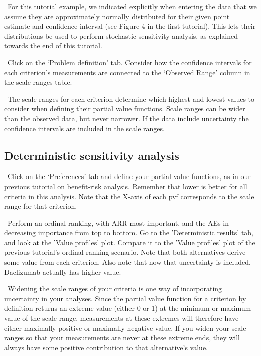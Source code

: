 \documentclass[00_mcda_tutorial.tex]{subfiles}
\begin{document}
\noindent \faGraduationCap \, For this tutorial example, we indicated explicitly when entering the data that we assume they are approximately normally distributed for their given point estimate and confidence interval (see Figure 4 in the first tutorial). This lets their distributions be used to perform stochastic sensitivity analysis, as explained towards the end of this tutorial.
\newline

\noindent \leftpointright \, Click on the ‘Problem definition’ tab. Consider how the confidence intervals for each criterion’s measurements are connected to the ‘Observed Range’ column in the scale ranges table.
\newline

\noindent \faGraduationCap \, The scale ranges for each criterion determine which highest and lowest values to consider when defining their partial value functions. Scale ranges can be wider than the observed data, but never narrower. If the data include uncertainty the confidence intervals are included in the scale ranges.

\subsection*{Deterministic sensitivity analysis}
\noindent \leftpointright \, Click on the ‘Preferences’ tab and define your partial value functions, as in our previous tutorial on benefit-risk analysis. Remember that lower is better for all criteria in this analysis. Note that the X-axis of each pvf corresponds to the scale range for that criterion.
\newline

\noindent \leftpointright \, Perform an ordinal ranking, with ARR most important, and the AEs in decreasing importance from top to bottom. Go to the 'Deterministic results' tab, and look at the 'Value profiles' plot. Compare it to the 'Value profiles' plot of the previous tutorial’s ordinal ranking scenario. Note that both alternatives derive some value from each criterion. Also note that now that uncertainty is included, Daclizumab actually has higher value.
\newline

\noindent \faGraduationCap \, Widening the scale ranges of your criteria is one way of incorporating uncertainty in your analyses. Since the partial value function for a criterion by definition returns an extreme value (either 0 or 1) at the minimum or maximum value of the scale range, measurements at these extremes will therefore have either maximally positive or maximally negative value. If you widen your scale ranges so that your measurements are never at these extreme ends, they will always have some positive contribution to that alternative’s value.
\newline
\end{document}
